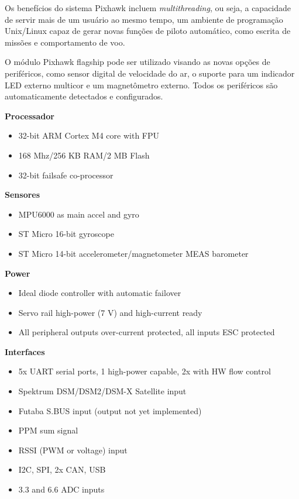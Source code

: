 Os benefícios do sistema Pixhawk incluem \textit{multithreading}, ou seja, a capacidade de servir mais de um usuário ao 
mesmo tempo, um ambiente de programação Unix/Linux capaz de gerar novas funções de piloto automático, como 
escrita de missões e comportamento de voo. \cite{pix}
 
O módulo Pixhawk flagship pode ser utilizado visando as novas opções de periféricos, como sensor digital de velocidade do ar, o suporte para um indicador LED externo multicor e um magnetômetro externo. Todos os periféricos são automaticamente detectados e configurados. \cite{pix}


\textbf{Processador}
\begin{itemize}
	\item 32-bit ARM Cortex M4 core with FPU
	\item 168 Mhz/256 KB RAM/2 MB Flash 
	\item 32-bit failsafe co-processor
\end{itemize}

\textbf{Sensores}
\begin{itemize}
\item MPU6000 as main accel and gyro
\item ST Micro 16-bit gyroscope
\item ST Micro 14-bit accelerometer/magnetometer MEAS barometer
\end{itemize}

\textbf{Power}
\begin{itemize}
\item Ideal diode controller with automatic failover
\item Servo rail high-power (7 V) and high-current ready
\item All peripheral outputs over-current protected, all inputs ESC protected
\end{itemize}

\textbf{Interfaces}
\begin{itemize}
\item 5x UART serial ports, 1 high-power capable, 2x with HW flow control 
\item Spektrum DSM/DSM2/DSM-X Satellite input
\item Futaba S.BUS input (output not yet implemented)
\item PPM sum signal
\item RSSI (PWM or voltage) input
\item I2C, SPI, 2x CAN, USB
\item 3.3 and 6.6 ADC inputs
\end{itemize}

